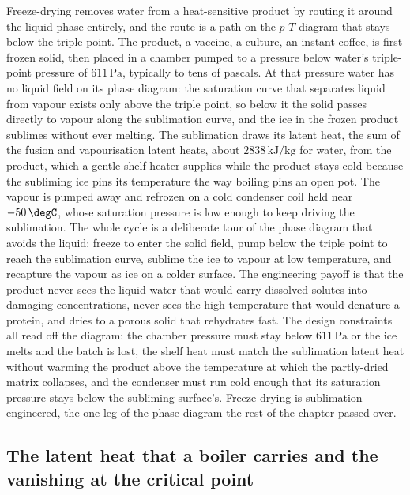 Freeze-drying removes water from a heat-sensitive product by routing it around
the liquid phase entirely, and the route is a path on the $p$-$T$ diagram that
stays below the triple point. The product, a vaccine, a culture, an instant
coffee, is first frozen solid, then placed in a chamber pumped to a pressure
below water's triple-point pressure of $611\,\text{Pa}$, typically to tens of
pascals. At that pressure water has no liquid field on its phase diagram: the
saturation curve that separates liquid from vapour exists only above the
triple point, so below it the solid passes directly to vapour along the
sublimation curve, and the ice in the frozen product sublimes without ever
melting. The sublimation draws its latent heat, the sum of the fusion and
vapourisation latent heats, about $2838\,\text{kJ}/\text{kg}$ for water,
from the product, which a gentle shelf heater supplies while the product
stays cold because the subliming ice pins its temperature the way boiling
pins an open pot. The vapour is pumped away and refrozen on a cold condenser
coil held near $-50\,\degC$, whose saturation pressure is low enough to keep
driving the sublimation. The whole cycle is a deliberate tour of the phase
diagram that avoids the liquid: freeze to enter the solid field, pump below
the triple point to reach the sublimation curve, sublime the ice to vapour at
low temperature, and recapture the vapour as ice on a colder surface. The
engineering payoff is that the product never sees the liquid water that would
carry dissolved solutes into damaging concentrations, never sees the
high temperature that would denature a protein, and dries to a porous solid
that rehydrates fast. The design constraints all read off the diagram: the
chamber pressure must stay below $611\,\text{Pa}$ or the ice melts and the
batch is lost, the shelf heat must match the sublimation latent heat without
warming the product above the temperature at which the partly-dried matrix
collapses, and the condenser must run cold enough that its saturation pressure
stays below the subliming surface's. Freeze-drying is sublimation engineered,
the one leg of the phase diagram the rest of the chapter passed over.

\subsection{The latent heat that a boiler carries and the vanishing at the
critical point}

